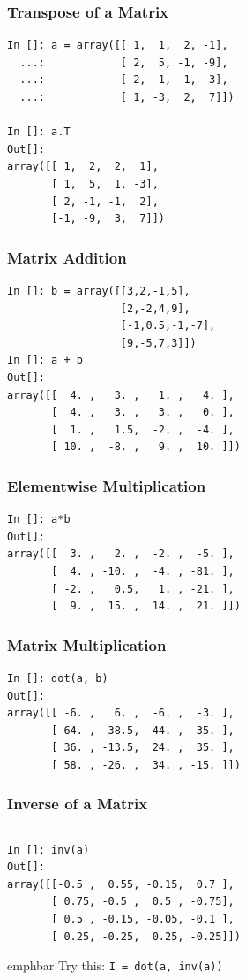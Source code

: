 \documentclass[14pt,compress]{beamer}
\newcommand{\emphbar}[1]
{\begin{beamercolorbox}[rounded=true]{emphbar}
      {#1}
 \end{beamercolorbox}
}
\newcommand{\typ}[1]{\lstinline{#1}}
\begin{document}
\begin{frame}[fragile]
\frametitle{Transpose of a Matrix}
\begin{lstlisting}
In []: a = array([[ 1,  1,  2, -1],
  ...:            [ 2,  5, -1, -9],
  ...:            [ 2,  1, -1,  3],
  ...:            [ 1, -3,  2,  7]])

In []: a.T
Out[]:
array([[ 1,  2,  2,  1],
       [ 1,  5,  1, -3],
       [ 2, -1, -1,  2],
       [-1, -9,  3,  7]])
\end{lstlisting}
\end{frame}

\begin{frame}[fragile]
  \frametitle{Matrix Addition}
  \begin{lstlisting}
In []: b = array([[3,2,-1,5],
                  [2,-2,4,9],
                  [-1,0.5,-1,-7],
                  [9,-5,7,3]])
In []: a + b
Out[]:
array([[  4. ,   3. ,   1. ,   4. ],
       [  4. ,   3. ,   3. ,   0. ],
       [  1. ,   1.5,  -2. ,  -4. ],
       [ 10. ,  -8. ,   9. ,  10. ]])
  \end{lstlisting}
\end{frame}

\begin{frame}[fragile]
\frametitle{Elementwise Multiplication}
\begin{lstlisting}
In []: a*b
Out[]:
array([[  3. ,   2. ,  -2. ,  -5. ],
       [  4. , -10. ,  -4. , -81. ],
       [ -2. ,   0.5,   1. , -21. ],
       [  9. ,  15. ,  14. ,  21. ]])

\end{lstlisting}
\end{frame}

\begin{frame}[fragile]
\frametitle{Matrix Multiplication}
\begin{lstlisting}
In []: dot(a, b)
Out[]:
array([[ -6. ,   6. ,  -6. ,  -3. ],
       [-64. ,  38.5, -44. ,  35. ],
       [ 36. , -13.5,  24. ,  35. ],
       [ 58. , -26. ,  34. , -15. ]])
\end{lstlisting}
\end{frame}

\begin{frame}[fragile]
\frametitle{Inverse of a Matrix}
\begin{lstlisting}

\end{lstlisting}
\begin{small}
\begin{lstlisting}
In []: inv(a)
Out[]:
array([[-0.5 ,  0.55, -0.15,  0.7 ],
       [ 0.75, -0.5 ,  0.5 , -0.75],
       [ 0.5 , -0.15, -0.05, -0.1 ],
       [ 0.25, -0.25,  0.25, -0.25]])
\end{lstlisting}
\end{small}
\emphbar{Try this: \typ{I = dot(a, inv(a))}}
\end{frame}
\end{document}
